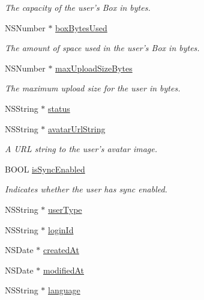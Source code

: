 \begin{DoxyCompactItemize}
\begin{DoxyCompactList}\small\item\em The capacity of the user's Box in bytes. \end{DoxyCompactList}\item 
N\-S\-Number $\ast$ \hyperlink{interface_m_b_user_acb7add7d0302f772a6129c0051613c31}{box\-Bytes\-Used}
\begin{DoxyCompactList}\small\item\em The amount of space used in the user's Box in bytes. \end{DoxyCompactList}\item 
N\-S\-Number $\ast$ \hyperlink{interface_m_b_user_a05bf0a718069ae9578677ffa56810faa}{max\-Upload\-Size\-Bytes}
\begin{DoxyCompactList}\small\item\em The maximum upload size for the user in bytes. \end{DoxyCompactList}\item 
N\-S\-String $\ast$ \hyperlink{interface_m_b_user_ac2acf327011ce6ed9e26a41ceddaee31}{status}
\item 
N\-S\-String $\ast$ \hyperlink{interface_m_b_user_a561dafa784b88045a1660b62565aa4ed}{avatar\-Url\-String}
\begin{DoxyCompactList}\small\item\em A U\-R\-L string to the user's avatar image. \end{DoxyCompactList}\item 
B\-O\-O\-L \hyperlink{interface_m_b_user_ad96023d6090470b8b69b65e4e82361d0}{is\-Sync\-Enabled}
\begin{DoxyCompactList}\small\item\em Indicates whether the user has sync enabled. \end{DoxyCompactList}\item 
N\-S\-String $\ast$ \hyperlink{interface_m_b_user_a4baa5811f82638a002a7b57635f6b864}{user\-Type}
\item 
N\-S\-String $\ast$ \hyperlink{interface_m_b_user_a133ab894b68ab5232ee18873bd749f36}{login\-Id}
\item 
N\-S\-Date $\ast$ \hyperlink{interface_m_b_user_a14b222dd776fc02c65470ce74c8cf1e1}{created\-At}
\item 
N\-S\-Date $\ast$ \hyperlink{interface_m_b_user_ac957ef51fb5ded8d1247e8716c750f5a}{modified\-At}
\item 
N\-S\-String $\ast$ \hyperlink{interface_m_b_user_a16b5f08f316920cc2cb6cd8527a81041}{language}
\item 

\end{DoxyCompactItemize}
